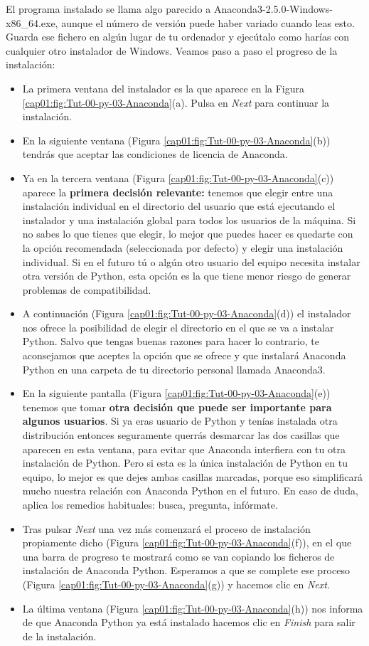 \documentclass[10pt,a4paper]{article}\usepackage[]{graphicx}\usepackage[]{color}
\newcounter {cont01}
\begin{document}
El programa instalado se llama algo parecido a {\sf Anaconda3-2.5.0-Windows-x86\_64.exe}, aunque el número de versión puede haber variado cuando leas esto. Guarda ese fichero en algún lugar de tu ordenador y ejecútalo como harías con cualquier otro instalador de Windows. Veamos paso a paso el progreso de la instalación:
\begin{itemize}
  \item La primera ventana del instalador es la que aparece en la Figura \ref{cap01:fig:Tut-00-py-03-Anaconda}(a). Pulsa en {\em Next} para continuar la instalación.
  \item En la siguiente ventana (Figura \ref{cap01:fig:Tut-00-py-03-Anaconda}(b)) tendrás que aceptar las condiciones de licencia de Anaconda.
  \item Ya en la tercera ventana (Figura \ref{cap01:fig:Tut-00-py-03-Anaconda}(c)) aparece la {\bf primera decisión relevante:} tenemos que elegir entre una instalación individual en el directorio del usuario que está ejecutando el instalador y una instalación global para todos los usuarios de la máquina. Si no sabes lo que tienes que elegir, lo mejor que puedes hacer es quedarte con la opción recomendada (seleccionada por defecto) y elegir una instalación individual. Si en el futuro tú o algún otro usuario del equipo necesita instalar otra versión de Python, esta opción es la que tiene menor riesgo de generar problemas de compatibilidad.
  \item A continuación (Figura \ref{cap01:fig:Tut-00-py-03-Anaconda}(d)) el instalador nos ofrece la posibilidad de elegir el directorio en el que se va a instalar Python. Salvo que tengas buenas razones para hacer lo contrario, te aconsejamos que aceptes la opción que se ofrece y que instalará Anaconda Python en una carpeta de tu directorio personal llamada {\sf Anaconda3}.
  \item En la siguiente pantalla (Figura \ref{cap01:fig:Tut-00-py-03-Anaconda}(e)) tenemos que tomar {\bf otra decisión que puede ser importante para algunos usuarios}. Si ya eras usuario de Python y tenías instalada otra distribución entonces seguramente querrás desmarcar las dos casillas que aparecen en esta ventana, para evitar que Anaconda interfiera con tu otra instalación de Python. Pero si esta es la única instalación de Python en tu equipo, lo mejor es que dejes ambas casillas marcadas, porque eso simplificará mucho nuestra relación con Anaconda Python en el futuro. En caso de duda, aplica los remedios habituales: busca, pregunta, infórmate.
  \item Tras pulsar {\em Next} una vez más comenzará el proceso de instalación propiamente dicho (Figura \ref{cap01:fig:Tut-00-py-03-Anaconda}(f)), en el que una barra de progreso te mostrará como se van copiando los ficheros de instalación de Anaconda Python. Esperamos a que se complete ese proceso (Figura \ref{cap01:fig:Tut-00-py-03-Anaconda}(g)) y hacemos clic en {\em Next}.
  \item La última ventana (Figura \ref{cap01:fig:Tut-00-py-03-Anaconda}(h)) nos informa de que Anaconda Python ya está instalado hacemos clic en {\em Finish} para salir de la instalación.
\end{itemize}
\end{document}
